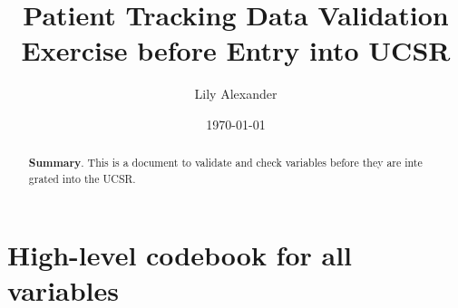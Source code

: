 \documentclass{article}
\begin{document}
\title{Patient Tracking Data Validation Exercise before Entry into UCSR}\author{
Lily Alexander
}

\date{
\bigskip
\today
}

\maketitle

\begin{abstract}
\textbf{Summary}. This is a document to validate and check variables before they are inte
grated into the UCSR.
\end{abstract}

\section{High-level codebook for all variables}
\end{document}
